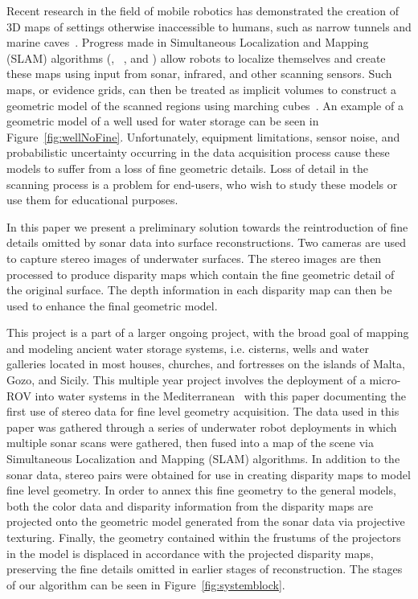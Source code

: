 \documentclass[twocolumn]{article}
\begin{document}
\noindent Recent research in the field of mobile robotics has demonstrated the creation of 3D maps of settings otherwise inaccessible to humans, such as narrow tunnels and marine caves~\cite{ICEX11,McVicker,McVicker2}. Progress made in Simultaneous Localization and Mapping (SLAM) algorithms  (\cite{Williams2000}, ~\cite{harbor}, and \cite{Fairfield2005,Fairfield2006}) allow robots to localize themselves and create these maps using input from sonar, infrared, and other scanning sensors. Such maps, or evidence grids, can then be treated as implicit volumes to construct a geometric model of the scanned regions using marching cubes~\cite{Lorensen}. An example of a geometric model of a well used for water storage can be seen in Figure~\ref{fig:wellNoFine}.
Unfortunately, equipment limitations, sensor noise, and probabilistic uncertainty occurring in the data acquisition process cause these models to suffer from a loss of fine geometric details. Loss of detail in the scanning process is a problem for end-users, who wish to study these models or use them for educational purposes.

In this paper we present a preliminary solution towards the reintroduction of fine details omitted by sonar data into surface reconstructions.
Two cameras are used to capture stereo images of underwater surfaces.
The stereo images are then processed to produce disparity maps which contain the fine geometric detail of the original surface.
The depth information in each disparity map can then be used to enhance the final geometric model.

This project is a part of a larger ongoing project, with the broad goal of mapping and modeling ancient water storage systems, i.e. cisterns, wells and water galleries located in most houses, churches, and fortresses on the islands of Malta, Gozo, and Sicily. This multiple year project involves the deployment of a micro-ROV into water systems in the Mediterranean~\cite{White10,ICEX11,McVicker,McVicker2} with this paper documenting the first use of stereo data for fine level geometry acquisition. The data used in this paper was gathered through a series of underwater robot deployments in which multiple sonar scans were gathered, then fused into a map of the scene via Simultaneous Localization and Mapping (SLAM) algorithms. In addition to the sonar data, stereo pairs were obtained for use in creating disparity maps to model fine level geometry. In order to annex this fine geometry to the general models, both the color data and disparity information from the disparity maps are projected onto the geometric model generated from the sonar data via projective texturing. Finally, the geometry contained within the frustums of the projectors in the model is displaced in accordance with the projected disparity maps, preserving the fine details omitted in earlier stages of reconstruction. The stages of our algorithm can be seen in Figure~\ref{fig:systemblock}.
\end{document}
